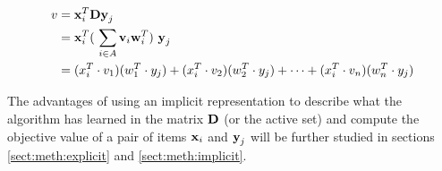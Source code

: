 \begin{equation} \label{eq:v-implicit}
    \begin{split}
        v &= \vect{x}_i^T \vect{D} \vect{y}_j \\
        &= \vect{x}_i^T (\ \sum_{i \in A} \vect{v}_i \vect{w}_i^T )\ \vect{y}_j \\
        &= ( x_i^T \cdot v_1 )  ( w_1^T \cdot y_j ) + ( x_i^T \cdot v_2 ) ( w_2^T  \cdot y_j ) + \cdots + ( x_i^T \cdot v_n )  ( w_n^T \cdot y_j ) \\
    \end{split}
\end{equation}

The advantages of using an implicit representation to describe what the \mlblink algorithm has learned in the matrix $\boldsymbol{\mathbf{D}}$ (or the active set) and compute the objective value of a pair of items $\boldsymbol{\mathbf{x}}_i$ and $\boldsymbol{\mathbf{y}}_j$ will be further studied in sections \ref{sect:meth:explicit} and \ref{sect:meth:implicit}.